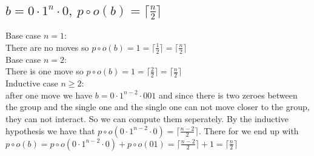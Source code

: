 \documentclass{article}
\begin{document}
\subsection{$b=0\cdot 1^n\cdot 0,\ p\circ o(b) = \lceil\frac{n}{2}\rceil$ }
Base case $n=1$: \\
There are no moves so $p\circ o(b)=1=\lceil\frac{1}{2}\rceil=\lceil\frac{n}{2}\rceil$\\
Base case $n=2$: \\
There is one move so $p\circ o(b)=1=\lceil\frac{2}{2}\rceil=\lceil\frac{n}{2}\rceil$\\
Inductive case $n\ge2$: \\
after one move we have $b = 0\cdot 1^{n-2}\cdot 001$ and since there is two zeroes between the group and the single one and the single one can not move closer to the group, they can not interact. So we can compute them seperately. By the inductive hypothesis we have that $p\circ o(0\cdot 1^{n-2}\cdot 0)=\lceil\frac{n-2}{2}\rceil$. There for we end up with $p\circ o(b)=p\circ o(0\cdot 1^{n-2}\cdot 0)+p\circ o(01)=\lceil\frac{n-2}{2}\rceil+1=\lceil\frac{n}{2}\rceil$\\
\end{document}
